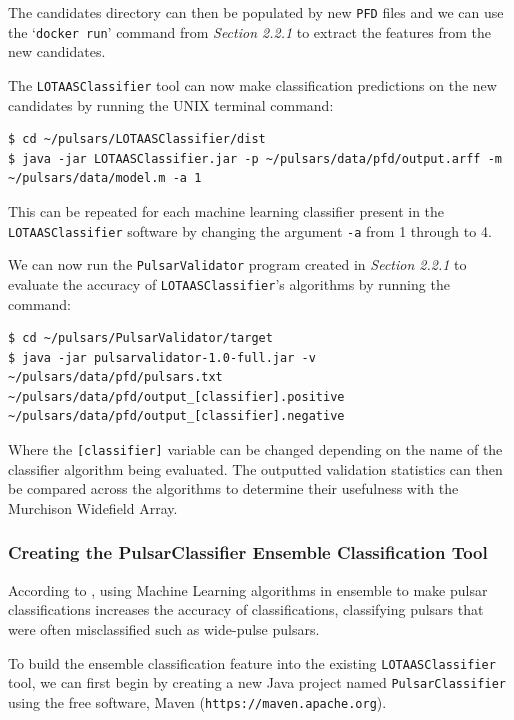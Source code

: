 \documentclass{article}
\begin{document}
The candidates directory can then be populated by new \verb|PFD| files and we can use the `\verb|docker run|' command from \emph{Section 2.2.1} to extract the features from the new candidates.

The \verb|LOTAASClassifier| tool can now make classification predictions on the new candidates by running the UNIX terminal command:

\begin{lstlisting}[numbers=none]
$ cd ~/pulsars/LOTAASClassifier/dist
$ java -jar LOTAASClassifier.jar -p ~/pulsars/data/pfd/output.arff -m ~/pulsars/data/model.m -a 1
\end{lstlisting}

This can be repeated for each machine learning classifier present in the \verb|LOTAASClassifier| software by changing the argument \verb|-a| from 1 through to 4.

We can now run the \verb|PulsarValidator| program created in \emph{Section 2.2.1} to evaluate the accuracy of \verb|LOTAASClassifier|'s algorithms by running the command:

\begin{lstlisting}[numbers=none]
$ cd ~/pulsars/PulsarValidator/target
$ java -jar pulsarvalidator-1.0-full.jar -v ~/pulsars/data/pfd/pulsars.txt ~/pulsars/data/pfd/output_[classifier].positive ~/pulsars/data/pfd/output_[classifier].negative
\end{lstlisting}

Where the \verb|[classifier]| variable can be changed depending on the name of the classifier algorithm being evaluated. The outputted validation statistics can then be compared across the algorithms to determine their usefulness with the Murchison Widefield Array.

\subsubsection{Creating the PulsarClassifier Ensemble Classification Tool}
\label{sec:methodensemble}
According to \cite{tan}, using Machine Learning algorithms in ensemble to make pulsar classifications increases the accuracy of classifications, classifying pulsars that were often misclassified such as wide-pulse pulsars.

To build the ensemble classification feature into the existing \verb|LOTAASClassifier| tool, we can first begin by creating a new Java project named \verb|PulsarClassifier| using the free software, Maven (\verb|https://maven.apache.org|).
\end{document}

